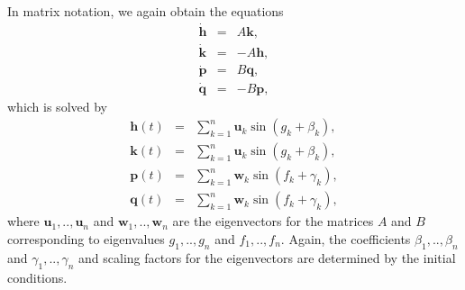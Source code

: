 \documentclass [12pt, a4paper] {article}
\newcommand{\vc}[1]
{
	\boldsymbol{#1}
}
\begin{document}
In matrix notation, we again obtain the equations 
\begin {eqnarray}
    \dot{\vc h} 
    &=& 
    A\vc k,
    \\
    \dot{\vc k} 
    &=& 
    -A\vc h, 
    \\
    \dot{\vc p} 
    &=& 
    B\vc q,
    \\
    \dot{\vc q} 
    &=& 
    -B\vc p,
\end {eqnarray}
which is solved by 
\begin {eqnarray}
    \vc h(t) &=& \sum_{k=1}^{n}\vc u_k\sin(g_k + \beta_k), \\
    \vc k(t) &=& \sum_{k=1}^{n}\vc u_k\sin(g_k + \beta_k), \\
    \vc p(t) &=& \sum_{k=1}^{n}\vc w_k\sin(f_k + \gamma_k), \\
    \vc q(t) &=& \sum_{k=1}^{n}\vc w_k\sin(f_k + \gamma_k),
\end {eqnarray}
where $\vc u_1, .. , \vc u_n$ and $\vc w_1, .., \vc w_n$ are the eigenvectors 
for the matrices $A$ and $B$ corresponding to eigenvalues $g_1, .., g_n$ and 
$f_1, .., f_n$. Again, the coefficients $\beta_1, .., \beta_n$ and 
$\gamma_1, .., \gamma_n$ and scaling factors for the eigenvectors are determined 
by the initial conditions.
\end{document}
